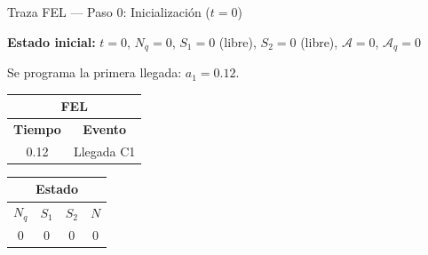 \documentclass[aspectratio=1610, 9pt]{beamer}
\begin{document}
\begin{frame}{Traza FEL --- Paso 0: Inicialización ($t=0$)}

\textbf{Estado inicial:} $t = 0$, \; $N_q = 0$, \; $S_1 = 0$ (libre), \; $S_2 = 0$ (libre), \; $\mathcal{A} = 0$, \; $\mathcal{A}_q = 0$

Se programa la primera llegada: $a_1 = 0.12$.

\vspace{0.3cm}
\begin{center}
\renewcommand{\arraystretch}{1.3}
\begin{tabular}{|c|c|}
\hline
\multicolumn{2}{|c|}{\cellcolor{azuloscuro!15}\textbf{FEL}} \\
\hline
\textbf{Tiempo} & \textbf{Evento} \\
\hline
0.12 & Llegada C1 \\
\hline
\end{tabular}
\hspace{2cm}
\begin{tabular}{|c|c|c|c|}
\hline
\multicolumn{4}{|c|}{\cellcolor{grisclaro}\textbf{Estado}} \\
\hline
$N_q$ & $S_1$ & $S_2$ & $N$ \\
\hline
0 & 0 & 0 & 0 \\
\hline
\end{tabular}
\end{center}

\vspace{0.3cm}
\begin{center}
\end{center}
\end{frame}
\end{document}
